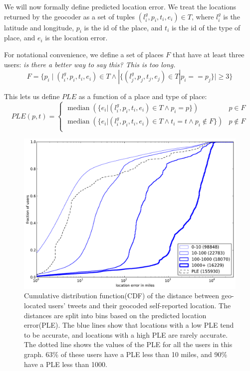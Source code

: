 \documentclass[letterpaper]{article}
\DeclareMathOperator{\median}{median}
\newcommand{\jam}[1]{\emph{#1}}
\begin{document}
\newcommand{\geotuple}{{(l^g_i,p_i,t_i,e_i) \in T}}

We will now formally define predicted location error.
%
We treat the locations returned by the geocoder as a set of tuples $\geotuple$,
where $l^g_i$ is the latitude and longitude, $p_i$ is the id of the place, and
$t_i$ is the id of the type of place, and $e_i$ is the location error.

For notational convenience, we define a set of places $F$ that have at least
three users:
\jam{is there a better way to say this? This is too long.}
\[
    F = \{ p_i \mid \geotuple \land |\{(l^g_j,p_j,t_j,e_j) \in T|p_i==p_j\}| \geq 3 \}
\]

This lets us define $PLE$ as a function of a place and type of place:
\[
    PLE(p,t) =
    \begin{cases}
        \median(\{e_i |\geotuple \land p_i=p\})  & p \in F \\
        \median(\{e_i |\geotuple \land t_i=t \land p_i \notin F\})  & p \notin F \\
    \end{cases}
\]

\begin{figure}[tb]
\centering
\includegraphics[width=\linewidth]{figures/mloc_mdist.pdf}
\caption{
Cumulative distribution function(CDF) of the distance between geo-located
users' tweets and their geocoded self-reported location.
%
The distances are split into bins based on the predicted location error(PLE).
%
The blue lines show that locations with a low PLE tend to be accurate, and
locations with a high PLE are rarely accurate.
%
The dotted line shows the values of the PLE for all the
users in this graph.
%
63\% of these users have a PLE less than 10 miles, and 90\% have a PLE
less than 1000.
}
\label{fig:DiffMlocMdist}
\end{figure}
\end{document}
